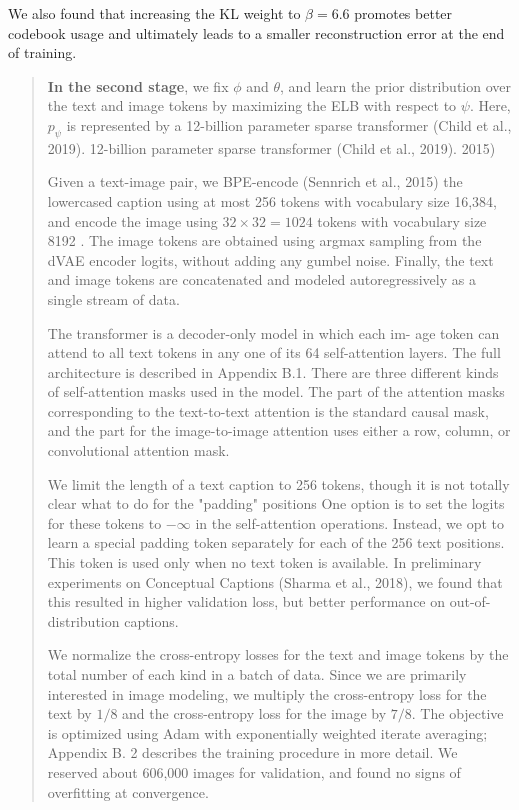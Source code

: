 \documentclass{article}
\begin{document}
\begin{appendix}
{We also found that increasing the KL weight to $\beta=6.6$ promotes better codebook usage and ultimately leads to a smaller reconstruction error at the end of training.
}

\blockquote{
\textbf{In the second stage}, we fix $\phi$ and $\theta$, and learn the prior distribution over the text and image tokens by maximizing the ELB with respect to $\psi$.
Here, $p_{\psi}$ is represented by a 12-billion parameter sparse transformer (Child et al., 2019).
12-billion parameter sparse transformer (Child et al., 2019). 2015)

Given a text-image pair, we BPE-encode (Sennrich et al., 2015) the lowercased caption using at most 256 tokens with vocabulary size 16,384, and encode the image using $32 \times 32=1024$ tokens with vocabulary size 8192 .
The image tokens are obtained using argmax sampling from the dVAE encoder logits, without adding any gumbel noise.
Finally, the text and image tokens are concatenated and modeled autoregressively as a single stream of data.

The transformer is a decoder-only model in which each im- age token can attend to all text tokens in any one of its 64 self-attention layers. The full architecture is described in Appendix B.1. There are three different kinds of self-attention masks used in the model. The part of the attention masks corresponding to the text-to-text attention is the standard causal mask, and the part for the image-to-image attention uses either a row, column, or convolutional attention mask.

We limit the length of a text caption to 256 tokens, though it is not totally clear what to do for the "padding" positions One option is to set the logits for these tokens to $-\infty$ in the self-attention operations. Instead, we opt to learn a special padding token separately for each of the 256 text positions. This token is used only when no text token is available. In preliminary experiments on Conceptual Captions (Sharma et al., 2018), we found that this resulted in higher validation loss, but better performance on out-of-distribution captions.

We normalize the cross-entropy losses for the text and image tokens by the total number of each kind in a batch of data. Since we are primarily interested in image modeling, we multiply the cross-entropy loss for the text by $1 / 8$ and the cross-entropy loss for the image by $7 / 8$. The objective is optimized using Adam with exponentially weighted iterate averaging; Appendix B. 2 describes the training procedure in more detail. We reserved about 606,000 images for validation, and found no signs of overfitting at convergence.
}


\end{appendix}
\end{document}
